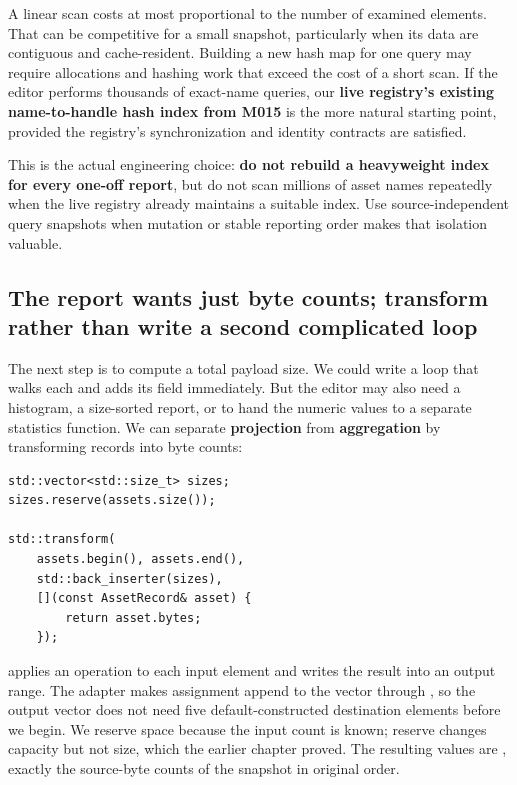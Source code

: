 A linear scan costs at most proportional to the number of examined elements. That can be competitive for a small snapshot, particularly when its data are contiguous and cache-resident. Building a new hash map for one query may require allocations and hashing work that exceed the cost of a short scan. If the editor performs thousands of exact-name queries, our \textbf{live registry's existing name-to-handle hash index from M015} is the more natural starting point, provided the registry's synchronization and identity contracts are satisfied.

This is the actual engineering choice: \textbf{do not rebuild a heavyweight index for every one-off report}, but do not scan millions of asset names repeatedly when the live registry already maintains a suitable index. Use source-independent query snapshots when mutation or stable reporting order makes that isolation valuable.

\subsection{The report wants just byte counts; transform rather than write a second complicated loop}\label{05-engine-i-ch006-the-report-wants-just-byte-counts-transform-rather-than-write-a-second-complicated-loop}

\hypertarget{05-engine-i-ch006-the-report-wants-just-byte-counts-transform-rather-than-write-a-second-complicated-loop}{}

The next step is to compute a total payload size. We could write a loop that walks each  and adds its  field immediately. But the editor may also need a histogram, a size-sorted report, or to hand the numeric values to a separate statistics function. We can separate \textbf{projection} from \textbf{aggregation} by transforming records into byte counts:

\begin{verbatim}
std::vector<std::size_t> sizes;
sizes.reserve(assets.size());

std::transform(
    assets.begin(), assets.end(),
    std::back_inserter(sizes),
    [](const AssetRecord& asset) {
        return asset.bytes;
    });
\end{verbatim}

 applies an operation to each input element and writes the result into an output range. The  adapter makes assignment append to the vector through , so the output vector does not need five default-constructed destination elements before we begin. We reserve space because the input count is known; reserve changes capacity but not size, which the earlier chapter proved. The resulting values are \BookInlineCode{{{[}}{4}{8}{,}{6}{4}{,}{1}{6}{,}{1}{2}{8}{,}{4}{8}{{]}}}{{[}48,64,16,128,48{]}}, exactly the source-byte counts of the snapshot in original order.

